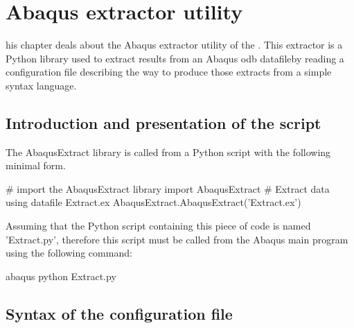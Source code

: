 
\chapter{Abaqus extractor utility}

\startcontents[chapters]
\printmyminitoc[1]his chapter deals about the Abaqus extractor utility
of the \Dynela. This extractor is a Python library used to extract
results from an Abaqus odb datafileby reading a configuration file
describing the way to produce those extracts from a simple syntax
language. 

\section{Introduction and presentation of the script}

The \textsf{AbaqusExtract} library is called from a Python script
with the following minimal form.

\begin{PythonListing}
# import the AbaqusExtract library
import AbaqusExtract
# Extract data using datafile Extract.ex
AbaqusExtract.AbaqusExtract('Extract.ex')
\end{PythonListing}

Assuming that the Python script containing this piece of code is named
\textsf{'Extract.py'}, therefore this script must be called from the
Abaqus main program using the following command: 

\textsf{abaqus python Extract.py}

\section{Syntax of the configuration file}

